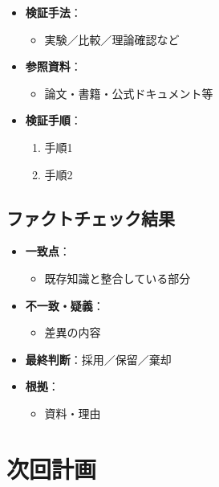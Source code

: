 \documentclass[a4paper,12pt]{ltjsarticle}
\begin{document}
\begin{itemize}
  \item \textbf{検証手法}：
    \begin{itemize}
      \item 実験／比較／理論確認など
    \end{itemize}
  \item \textbf{参照資料}：
    \begin{itemize}
      \item 論文・書籍・公式ドキュメント等
    \end{itemize}
  \item \textbf{検証手順}：
    \begin{enumerate}
      \item 手順1
      \item 手順2
    \end{enumerate}
\end{itemize}

\subsection{ファクトチェック結果}
\begin{itemize}
  \item \textbf{一致点}：
    \begin{itemize}
      \item 既存知識と整合している部分
    \end{itemize}
  \item \textbf{不一致・疑義}：
    \begin{itemize}
      \item 差異の内容
    \end{itemize}
  \item \textbf{最終判断}：採用／保留／棄却
  \item \textbf{根拠}：
    \begin{itemize}
      \item 資料・理由
    \end{itemize}
\end{itemize}

\section{次回計画}
\end{document}
